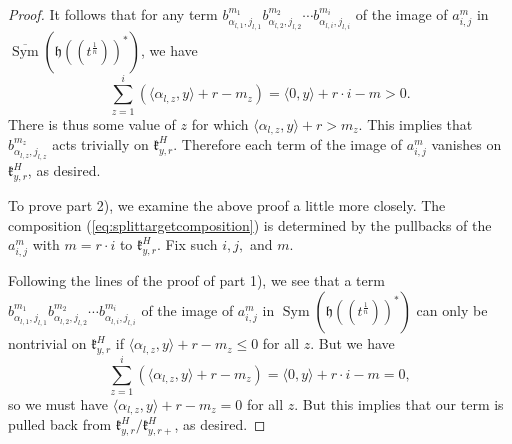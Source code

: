 \documentclass[12pt]{article}
\DeclareMathOperator{\Sym}{Sym}
\theoremstyle{remark}
\begin{document}
\begin{proof}
It follows that for any term $b_{\alpha_{l,1},j_{l,1}}^{m_1}b_{\alpha_{l,2},j_{l,2}}^{m_2}\cdots b_{\alpha_{l,i},j_{l,i}}^{m_i}$ of the image of $a_{i,j}^m$ in $\overline{\Sym}(\mathfrak{h}((t^{\frac{1}{n}}))^*)$, we have
\[
\displaystyle\sum_{z=1}^i(\langle\alpha_{l,z},y\rangle+r-m_z)=\langle 0,y\rangle+r\cdot i-m > 0.
\]
There is thus some value of $z$ for which $\langle\alpha_{l,z},y\rangle+r > m_z.$ This implies that $b_{\alpha_{l,z},j_{l,z}}^{m_z}$ acts trivially on $\mathfrak{k}_{y,r}^H$. Therefore each term of the image of $a_{i,j}^m$ vanishes on $\mathfrak{k}_{y,r}^H$, as desired.

To prove part 2), we examine the above proof a little more closely. The composition (\ref{eq:splittargetcomposition}) is determined by the pullbacks of the $a_{i,j}^m$ with $m=r\cdot i$ to $\mathfrak{k}_{y,r}^H$. Fix such $i,j,$ and $m$. 

Following the lines of the proof of part 1), we see that a term $b_{\alpha_{l,1},j_{l,1}}^{m_1}b_{\alpha_{l,2},j_{l,2}}^{m_2}\cdots b_{\alpha_{l,i},j_{l,i}}^{m_i}$ of the image of $a_{i,j}^m$ in $\Sym(\mathfrak{h}((t^{\frac{1}{n}}))^*)$ can only be nontrivial on $\mathfrak{k}_{y,r}^H$ if $\langle\alpha_{l,z},y\rangle+r-m_z\leq 0$ for all $z$. But we have
\[
\displaystyle\sum_{z=1}^i(\langle\alpha_{l,z},y\rangle+r-m_z)=\langle 0,y\rangle+r\cdot i-m = 0,
\]
so we must have $\langle\alpha_{l,z},y\rangle+r-m_z= 0$ for all $z$. But this implies that our term is pulled back from $\mathfrak{k}_{y,r}^H/\mathfrak{k}_{y,r+}^H$, as desired.
\end{proof}
\end{document}

